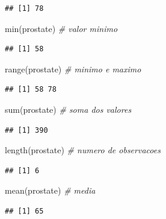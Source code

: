 \documentclass[
]{book}
\newenvironment{Shaded}{\begin{snugshade}}{\end{snugshade}}
\newcommand{\CommentTok}[1]{\textcolor[rgb]{0.56,0.35,0.01}{\textit{#1}}}
\newcommand{\FunctionTok}[1]{\textcolor[rgb]{0.00,0.00,0.00}{#1}}
\newcommand{\NormalTok}[1]{#1}
\begin{document}
\begin{verbatim}
## [1] 78
\end{verbatim}

\begin{Shaded}
\begin{Highlighting}[]
\FunctionTok{min}\NormalTok{(prostate)      }\CommentTok{\# valor minimo}
\end{Highlighting}
\end{Shaded}

\begin{verbatim}
## [1] 58
\end{verbatim}

\begin{Shaded}
\begin{Highlighting}[]
\FunctionTok{range}\NormalTok{(prostate)    }\CommentTok{\# minimo e maximo}
\end{Highlighting}
\end{Shaded}

\begin{verbatim}
## [1] 58 78
\end{verbatim}

\begin{Shaded}
\begin{Highlighting}[]
\FunctionTok{sum}\NormalTok{(prostate)      }\CommentTok{\# soma dos valores}
\end{Highlighting}
\end{Shaded}

\begin{verbatim}
## [1] 390
\end{verbatim}

\begin{Shaded}
\begin{Highlighting}[]
\FunctionTok{length}\NormalTok{(prostate)   }\CommentTok{\# numero de observacoes}
\end{Highlighting}
\end{Shaded}

\begin{verbatim}
## [1] 6
\end{verbatim}

\begin{Shaded}
\begin{Highlighting}[]
\FunctionTok{mean}\NormalTok{(prostate)     }\CommentTok{\# media}
\end{Highlighting}
\end{Shaded}

\begin{verbatim}
## [1] 65
\end{verbatim}
\end{document}
